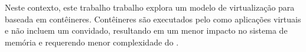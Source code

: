 Neste contexto, este trabalho trabalho explora um modelo de virtualização para \lw baseada em contêineres. Contêineres são executados pelo \os como aplicações virtuais e não incluem um \os convidado, resultando em um menor impacto no sistema de memória e requerendo menor complexidade do \hardware \cite{thalheim2018cntr, sharma2016containers}.
    
